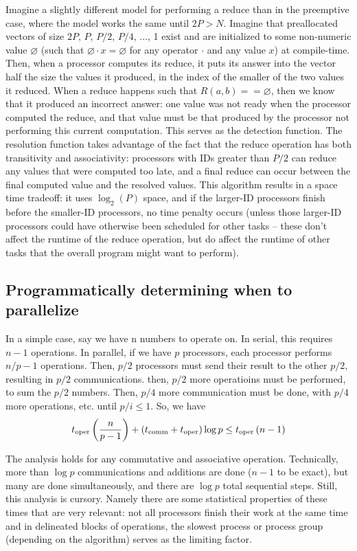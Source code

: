 Imagine a slightly different model for performing a reduce than in the
preemptive case, where the model works the same until $2P > N$. Imagine that
preallocated vectors of size $2P$, $P$, $P/2$, $P/4$, ..., 1 exist and are
initialized to some non-numeric value $\varnothing$ (such that $\varnothing
\cdot x = \varnothing$ for any operator $\cdot$ and any value $x$) at
compile-time. Then, when a processor computes its reduce, it puts its answer
into the vector half the size the values it produced, in the index of the
smaller of the two values it reduced. When a reduce happens such that $R(a,b) ==
\varnothing$, then we know that it produced an incorrect answer: one value was
not ready when the processor computed the reduce, and that value must be that
produced by the processor not performing this current computation. This serves
as the detection function. The resolution function takes advantage of the fact
that the reduce operation has both transitivity and associativity: processors
with IDs greater than $P/2$ can reduce any values that were computed too late,
and a final reduce can occur between the final computed value and the resolved
values. This algorithm results in a space time tradeoff: it uses $\log_2(P)$
space, and if the larger-ID processors finish before the smaller-ID processors,
no time penalty occurs (unless those larger-ID processors could have otherwise
been scheduled for other tasks -- these don't affect the runtime of the reduce
operation, but do affect the runtime of other tasks that the overall program
might want to perform).

\subsection{Programmatically determining when to parallelize}
In a simple case, say we have n numbers to operate on. In serial, this requires $n-1$
operations. In parallel, if we have $p$ processors, each processor performs
$n/p - 1$ operations. Then, $p/2$ processors must send their result to the other
$p/2$, resulting in $p/2$ communications. then, $p/2$ more operatioins must be
performed, to sum the $p/2$ numbers. Then, $p/4$ more communication must be done,
with $p/4$ more operations, etc. until $p/i \leq 1$. So, we have
\begin{align*}
t_\mathrm{oper}\left(\frac{n}{p-1}\right) + \left(t_\mathrm{comm} + t_\mathrm{oper}\right)\log{p} \leq t_\mathrm{oper}\left(n-1\right)
\end{align*}

The analysis holds for any commutative and associative operation. Technically,
more than $\log{p}$ communications and additions are done ($n-1$ to be exact),
but many are done simultaneously, and there are $\log{p}$ total sequential
steps. Still, this analysis is cursory. Namely there are some statistical
properties of these times that are very relevant: not all processors finish
their work at the same time and in delineated blocks of operations, the slowest
process or process group (depending on the algorithm) serves as the limiting
factor.


